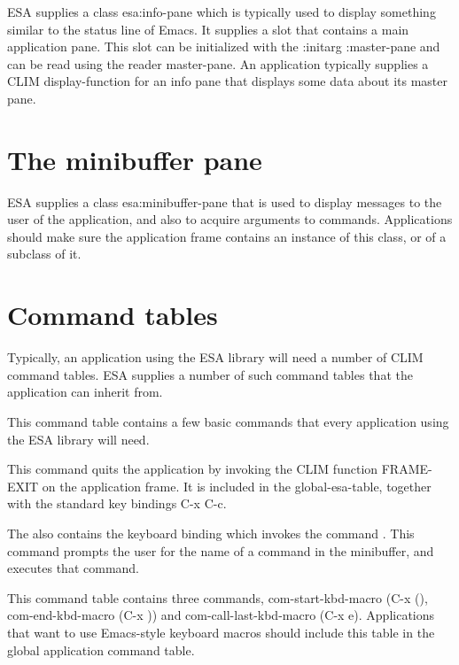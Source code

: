 ESA supplies a class esa:info-pane which is typically used to display
something similar to the status line of Emacs.  It supplies a slot
that contains a main application pane.  This slot can be initialized
with the :initarg :master-pane and can be read using the reader
master-pane.  An application typically supplies a CLIM
display-function for an info pane that displays some data about its 
master pane. 

\section{The minibuffer pane}

ESA supplies a class esa:minibuffer-pane that is used to display
messages to the user of the application, and also to acquire arguments
to commands.  Applications should make sure the application frame
contains an instance of this class, or of a subclass of it.  

\section{Command tables}

Typically, an application using the ESA library will need a number of
CLIM command tables.  ESA supplies a number of such command tables
that the application can inherit from.  


This command table contains a few basic commands that every
application using the ESA library will need.

 {}

This command quits the application by invoking the CLIM function
FRAME-EXIT on the application frame.  It is included in the
global-esa-table, together with the standard key bindings C-x C-c. 

The  also contains the keyboard binding
 which invokes the command .  This
command prompts the user for the name of a command in the minibuffer,
and executes that command.


This command table contains three commands, com-start-kbd-macro (C-x
(), com-end-kbd-macro (C-x )) and com-call-last-kbd-macro (C-x e).
Applications that want to use Emacs-style keyboard macros should
include this table in the global application command table. 
